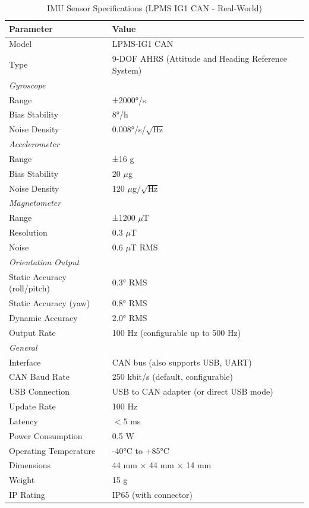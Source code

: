 \begin{table}[htbp]
\centering
\caption{IMU Sensor Specifications (LPMS IG1 CAN - Real-World)}
\label{tab:imu_specs_real}
\begin{tabular}{@{}ll@{}}
\toprule
\textbf{Parameter} & \textbf{Value} \\
\midrule
Model & LPMS-IG1 CAN \\
Type & 9-DOF AHRS (Attitude and Heading Reference System) \\
\midrule
\multicolumn{2}{l}{\textit{Gyroscope}} \\
Range & ±2000°/s \\
Bias Stability & 8°/h \\
Noise Density & 0.008°/s/$\sqrt{\text{Hz}}$ \\
\midrule
\multicolumn{2}{l}{\textit{Accelerometer}} \\
Range & ±16 g \\
Bias Stability & 20 $\mu$g \\
Noise Density & 120 $\mu$g/$\sqrt{\text{Hz}}$ \\
\midrule
\multicolumn{2}{l}{\textit{Magnetometer}} \\
Range & ±1200 $\mu$T \\
Resolution & 0.3 $\mu$T \\
Noise & 0.6 $\mu$T RMS \\
\midrule
\multicolumn{2}{l}{\textit{Orientation Output}} \\
Static Accuracy (roll/pitch) & 0.3° RMS \\
Static Accuracy (yaw) & 0.8° RMS \\
Dynamic Accuracy & 2.0° RMS \\
Output Rate & 100 Hz (configurable up to 500 Hz) \\
\midrule
\multicolumn{2}{l}{\textit{General}} \\
Interface & CAN bus (also supports USB, UART) \\
CAN Baud Rate & 250 kbit/s (default, configurable) \\
USB Connection & USB to CAN adapter (or direct USB mode) \\
Update Rate & 100 Hz \\
Latency & $< 5$ ms \\
Power Consumption & 0.5 W \\
Operating Temperature & -40°C to +85°C \\
Dimensions & 44 mm × 44 mm × 14 mm \\
Weight & 15 g \\
IP Rating & IP65 (with connector) \\
\bottomrule
\end{tabular}
\end{table}

